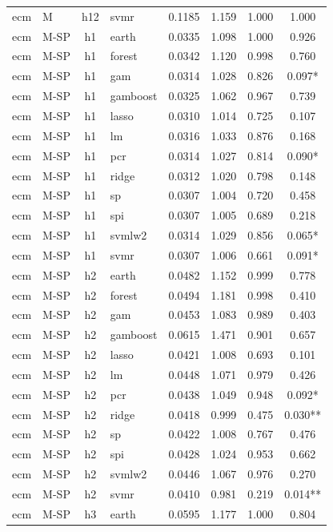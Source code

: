 \begin{ThreePartTable}
\begin{longtable}[t]{llclcccc}
ecm & M & h12 & svmr & 0.1185 & 1.159 & 1.000 & 1.000\\
\addlinespace
ecm & M-SP & h1 & earth & 0.0335 & 1.098 & 1.000 & 0.926\\
ecm & M-SP & h1 & forest & 0.0342 & 1.120 & 0.998 & 0.760\\
ecm & M-SP & h1 & gam & 0.0314 & 1.028 & 0.826 & 0.097*\\
ecm & M-SP & h1 & gamboost & 0.0325 & 1.062 & 0.967 & 0.739\\
ecm & M-SP & h1 & lasso & 0.0310 & 1.014 & 0.725 & 0.107\\
ecm & M-SP & h1 & lm & 0.0316 & 1.033 & 0.876 & 0.168\\
ecm & M-SP & h1 & pcr & 0.0314 & 1.027 & 0.814 & 0.090*\\
ecm & M-SP & h1 & ridge & 0.0312 & 1.020 & 0.798 & 0.148\\
ecm & M-SP & h1 & sp & 0.0307 & 1.004 & 0.720 & 0.458\\
ecm & M-SP & h1 & spi & 0.0307 & 1.005 & 0.689 & 0.218\\
ecm & M-SP & h1 & svmlw2 & 0.0314 & 1.029 & 0.856 & 0.065*\\
ecm & M-SP & h1 & svmr & 0.0307 & 1.006 & 0.661 & 0.091*\\
\addlinespace
ecm & M-SP & h2 & earth & 0.0482 & 1.152 & 0.999 & 0.778\\
ecm & M-SP & h2 & forest & 0.0494 & 1.181 & 0.998 & 0.410\\
ecm & M-SP & h2 & gam & 0.0453 & 1.083 & 0.989 & 0.403\\
ecm & M-SP & h2 & gamboost & 0.0615 & 1.471 & 0.901 & 0.657\\
ecm & M-SP & h2 & lasso & 0.0421 & 1.008 & 0.693 & 0.101\\
ecm & M-SP & h2 & lm & 0.0448 & 1.071 & 0.979 & 0.426\\
ecm & M-SP & h2 & pcr & 0.0438 & 1.049 & 0.948 & 0.092*\\
ecm & M-SP & h2 & ridge & 0.0418 & 0.999 & 0.475 & 0.030**\\
ecm & M-SP & h2 & sp & 0.0422 & 1.008 & 0.767 & 0.476\\
ecm & M-SP & h2 & spi & 0.0428 & 1.024 & 0.953 & 0.662\\
ecm & M-SP & h2 & svmlw2 & 0.0446 & 1.067 & 0.976 & 0.270\\
ecm & M-SP & h2 & svmr & 0.0410 & 0.981 & 0.219 & 0.014**\\
\addlinespace
ecm & M-SP & h3 & earth & 0.0595 & 1.177 & 1.000 & 0.804\\

\end{longtable}
\end{ThreePartTable}
